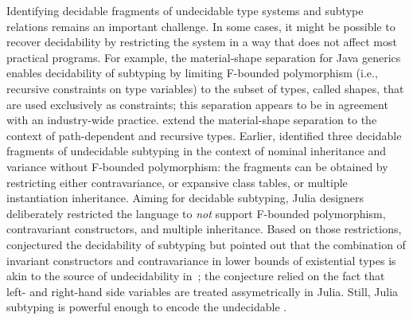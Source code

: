 Identifying decidable fragments of undecidable type systems and subtype
relations remains an important challenge.
In some cases, it might be possible to recover
decidability by restricting the system in a way that does not affect most
practical programs. For example, the material-shape separation for Java
generics~\cite{greenman:f-bound-material-shape:2014}
enables decidability of subtyping by limiting F-bounded polymorphism %
(i.e., recursive constraints on type variables)
to the subset of types, called shapes, that are used exclusively as constraints;
this separation appears to be in agreement with an industry-wide practice.
\citet{mackay:path-dep-dec:2020} extend the material-shape separation
to the context of path-dependent and recursive types. %
Earlier, \citet{kennedy:nom-sub-var-dec:2007} identified three decidable
fragments of undecidable subtyping in the context of nominal inheritance
and variance without F-bounded polymorphism: the fragments can be obtained by
restricting either contravariance, or expansive class tables,
or multiple instantiation inheritance.
Aiming for decidable subtyping, Julia designers deliberately restricted
the language to \emph{not} support F-bounded polymorphism, 
contravariant constructors, and multiple inheritance.
Based on those restrictions, \citet{bezanson:julia:2015} conjectured
the decidability of subtyping but pointed out that
the combination of invariant constructors
and contravariance in lower bounds of existential types
is akin to the source of undecidability in~\FSub;
the conjecture relied on the fact that left- and right-hand side variables
are treated assymetrically in Julia.
Still, Julia subtyping is powerful enough to encode
the undecidable \FSub.

